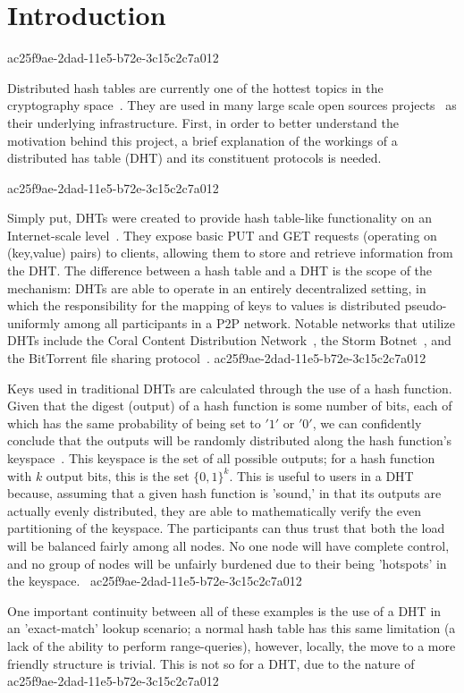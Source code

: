 \documentclass[12pt]{article}
\begin{document}
\section{Introduction}
ac25f9ae-2dad-11e5-b72e-3c15c2c7a012\par Distributed hash tables are currently one of the hottest topics in the cryptography space~\cite{Stoica:2001dj,Rowstron:2001ea,Ratnasamy:2001wn}. They are used in many large scale open sources projects~\cite{Freitas:2013tb,Xu:2010vs,Perfitt:2010fh} as their underlying infrastructure. First, in order to better understand the motivation behind this project, a brief explanation of the workings of a distributed has table (DHT) and its constituent protocols is needed.

ac25f9ae-2dad-11e5-b72e-3c15c2c7a012\par Simply put, DHTs were created to provide hash table-like functionality on an Internet-scale level~\cite{Ratnasamy:2001wn}. They expose basic PUT and GET requests (operating on (key,value) pairs) to clients, allowing them to store and retrieve information from the DHT. The difference between a hash table and a DHT is the scope of the mechanism: DHTs are able to operate in an entirely decentralized setting, in which the responsibility for the mapping of keys to values is distributed pseudo-uniformly among all participants in a P2P network. Notable networks that utilize DHTs include the Coral Content Distribution Network~\cite{Freedman:2004vb}, the Storm Botnet~\cite{Holz:2008uk}, and the BitTorrent file sharing protocol~\cite{Cohen:y1_8mBnw}.
ac25f9ae-2dad-11e5-b72e-3c15c2c7a012
\par Keys used in traditional DHTs are calculated through the use of a hash function. Given that the digest (output) of a hash function is some number of bits, each of which has the same probability of being set to $'1'$ or $'0'$, we can confidently conclude that the outputs will be randomly distributed along the hash function's keyspace~. This keyspace is the set of all possible outputs; for a hash function with $k$ output bits, this is the set $\{0,1\}^k$. This is useful to users in a DHT because, assuming that a given hash function is 'sound,' in that its outputs are actually evenly distributed, they are able to mathematically verify the even partitioning of the keyspace. The participants can thus trust that both the load will be balanced fairly among all nodes. No one node will have complete control, and no group of nodes will be unfairly burdened due to their being 'hotspots' in the keyspace.~
ac25f9ae-2dad-11e5-b72e-3c15c2c7a012
\par One important continuity between all of these examples is the use of a DHT in an 'exact-match' lookup scenario; a normal hash table has this same limitation (a lack of the ability to perform range-queries), however, locally, the move to a more friendly structure is trivial. This is not so for a DHT, due to the nature of
ac25f9ae-2dad-11e5-b72e-3c15c2c7a012\printbibliography
\end{document}
